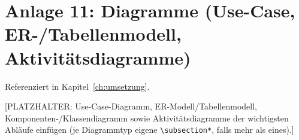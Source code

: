 \section*{Anlage 11: Diagramme (Use-Case, ER-/Tabellenmodell, Aktivit\"atsdiagramme)}
\label{anh:diagramme}
Referenziert in Kapitel~\ref{ch:umsetzung}.

[PLATZHALTER: Use-Case-Diagramm, ER-Modell/Tabellenmodell,
Komponenten-/Klassendiagramm sowie Aktivit\"atsdiagramme der wichtigsten
Abl\"aufe einf\"ugen (je Diagrammtyp eigene \verb|\subsection*|, falls mehr
als eines).]
